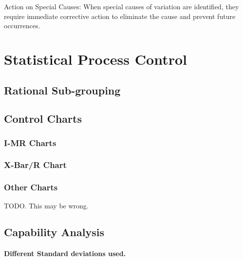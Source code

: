 \documentclass[11pt]{article}
\begin{document}
Action on Special Causes: When special causes of variation are
identified, they require immediate corrective action to eliminate the
cause and prevent future occurrences.

    \hypertarget{statistical-process-control}{%
\section{Statistical Process
Control}\label{statistical-process-control}}

    \hypertarget{rational-sub-grouping}{%
\subsection{Rational Sub-grouping}\label{rational-sub-grouping}}

\hypertarget{control-charts}{%
\subsection{Control Charts}\label{control-charts}}

\hypertarget{i-mr-charts}{%
\subsubsection{I-MR Charts}\label{i-mr-charts}}

\hypertarget{x-barr-chart}{%
\subsubsection{X-Bar/R Chart}\label{x-barr-chart}}

\hypertarget{other-charts}{%
\subsubsection{Other Charts}\label{other-charts}}

TODO. This may be wrong. 
\hypertarget{capability-analysis}{%
\subsection{Capability Analysis}\label{capability-analysis}}

\hypertarget{different-standard-deviations.}{%
\paragraph{Different Standard deviations used.}\label{different-standard-deviations.}}
\end{document}
